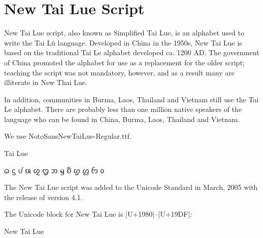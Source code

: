 \section{New Tai Lue Script}
\label{s:newtailue}
\let\tailue\pan

New Tai Lue script, also known as Simplified Tai Lue, is an alphabet used to write the Tai Lü language. Developed in China in the 1950s, New Tai Lue is based on the traditional Tai Le alphabet developed ca. 1200 AD. The government of China promoted the alphabet for use as a replacement for the older script; teaching the script was not mandatory, however, and as a result many are illiterate in New Thai Lue. 

In addition, communities in Burma, Laos, Thailand and Vietnam still use the Tai Le alphabet. There are probably less than one million native speakers of the language who can be found in China, Burma, Laos, Thailand and Vietnam.

We use NotoSansNewTaiLue-Regular.ttf.

\begin{scriptexample}[]{Tai Lue}
{\centering\tailue \LARGE

ᦒ	ᦓ	ᦔ	ᦕ	ᦖ	ᦗ	ᦘ	ᦙ	ᦚ	ᦛ	ᦜ	ᦝ	ᦞ	

}
\end{scriptexample}

The New Tai Lue script was added to the Unicode Standard in March, 2005 with the release of version 4.1.

The Unicode block for New Tai Lue is |U+1980|–|U+19DF|:

\begin{scriptexample}[]{New Tai Lue}
\end{scriptexample}